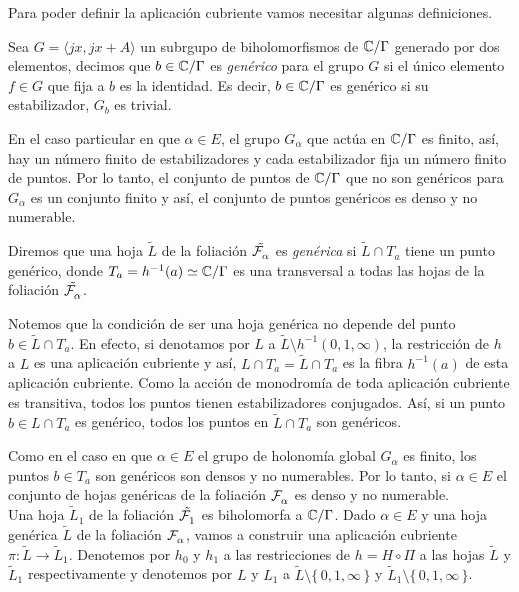 Para poder definir la aplicación cubriente vamos necesitar algunas definiciones. 
\begin{defn}
\label{Def:PuntoGenerico}
Sea $G=\langle jx,jx+A\rangle$ un subrgupo de biholomorfismos de $\mathbb{C}/\Gamma$ generado por dos elementos, decimos que $b\in\mathbb{C}/\Gamma$ es \emph{genérico} para el grupo $G$ si el único elemento $f\in G$ que fija a $b$ es la identidad. Es decir, $b\in\mathbb{C}/\Gamma$ es genérico si su estabilizador, $G_{b}$ es trivial.
\end{defn}

En el caso particular en que $\alpha\in E$, el grupo $G_{\alpha}$ que actúa en $\mathbb{C}/\Gamma$ es finito, así, hay un número finito de estabilizadores y cada estabilizador fija un número finito de puntos. Por lo tanto, el conjunto de puntos de $\mathbb{C}/\Gamma$ que no son genéricos para $G_{\alpha}$ es un conjunto finito y así, el conjunto de puntos genéricos es denso y no numerable.

\begin{defn}
\label{Def:HojaGenerica}
 Diremos que una hoja $\tilde{L}$ de la foliación $\tilde{\mathcal{F}^{\ }_{\alpha}}$ es \emph{genérica} si $\tilde{L}\cap T_{a}$ tiene un punto genérico, donde $T_{a}=h^{-1}(a)\simeq\mathbb{C}/\Gamma$ es una transversal a todas las hojas de la foliación $\tilde{\mathcal{F}^{\ }_{\alpha}}$.
\end{defn}

Notemos que la condición de ser una hoja genérica no depende del punto $b\in\tilde{L}\cap T_{a}$. En efecto, si denotamos por $L$ a $\tilde{L}\setminus h^{-1}(0,1,\infty)$, la restricción de $h$ a $L$ es una aplicación cubriente y así, $L\cap T_{a}=\tilde{L}\cap T_{a}$ es la fibra $h^{-1}(a)$ de esta aplicación cubriente. Como la acción de monodromía de toda aplicación cubriente es transitiva, todos los puntos tienen estabilizadores conjugados. Así, si un punto $b\in L\cap T_{a}$ es genérico, todos los puntos en $\tilde{L}\cap T_{a}$ son genéricos.

Como en el caso en que $\alpha\in E$ el grupo de holonomía global $G_{\alpha}$ es finito, los puntos $b\in T_{a}$ son genéricos son densos y no numerables. Por lo tanto, si $\alpha\in E$ el conjunto de hojas genéricas de la foliación $\mathcal{F}^{\ }_{\alpha}$ es denso y no numerable.\\

Una hoja $\tilde{L}_{1}$ de la foliación $\tilde{\mathcal{F}^{\ }_{1}}$ es biholomorfa a $\mathbb{C}/\Gamma$. Dado $\alpha\in E$ y una hoja genérica $\tilde{L}$ de la foliación $\mathcal{F}^{\ }_{\alpha}$, vamos a construir una aplicación cubriente $\pi\colon\tilde{L}\rightarrow\tilde{L}_{1}$. Denotemos por $h_{0}$ y $h_{1}$ a las restricciones de $h=H\circ\Pi$ a las hojas $\tilde{L}$ y $\tilde{L}_{1}$ respectivamente y denotemos por $L$ y $L_{1}$ a $\tilde{L}\setminus\{\, 0,1,\infty \, \}$ y $\tilde{L}_{1}\setminus\{\, 0,1,\infty \, \}$.

